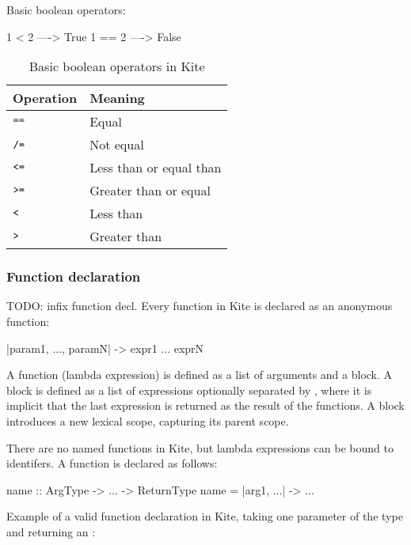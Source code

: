 Basic boolean operators:
\begin{kite}
1 < 2  ----> True
1 == 2 ----> False
\end{kite}

\begin{table}[H]
  \centering
  \begin{tabular}{ll}
    \textbf{Operation} & \textbf{Meaning} \\ \hline
    $\texttt{==}$ & Equal                   \\ \hline
    $\texttt{/=}$ & Not equal               \\ \hline
    $\texttt{<=}$ & Less than or equal than \\ \hline
    $\texttt{>=}$ & Greater than or equal   \\ \hline
    $\texttt{<}$  & Less than               \\ \hline
    $\texttt{>}$  & Greater than            \\ \hline
  \end{tabular}
  \caption{Basic boolean operators in Kite}
\label{tbl:kite-disign-bool-op}
\end{table}


\subsubsection{Function declaration} TODO: infix function decl.
\label{sec:func-decl}
Every function in Kite is declared as an anonymous function:

\begin{kite}
|param1, ..., paramN| -> {
  expr1
  ...
  exprN
}
\end{kite}

A function (lambda expression) is defined as a list of arguments and a block. A block is defined as a list of expressions optionally separated by \code{;}, where it is implicit that the last expression is returned as the result of the functions. A block introduces a new lexical scope, capturing its parent scope.

There are no named functions in Kite, but lambda expressions can be bound to identifers. A function is declared as follows:

\begin{kite}
name :: ArgType -> ... -> ReturnType
name = |arg1, ...| -> { ... }
\end{kite}

Example of a valid function declaration in Kite, taking one parameter of the type  and returning an :

